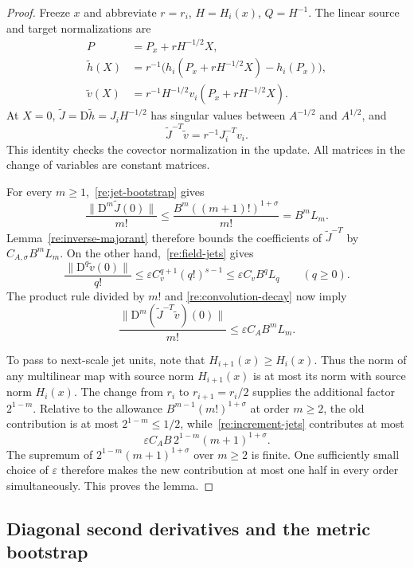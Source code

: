 \begin{proof}
Freeze $x$ and abbreviate $r=r_i$, $H=H_i(x)$, $Q=H^{-1}$.
The linear source and target normalizations are
\[
 \begin{aligned}
 P&=P_x+rH^{-1/2}X,\\
 \widetilde h(X)
   &=r^{-1}\bigl(h_i(P_x+rH^{-1/2}X)-h_i(P_x)\bigr),\\
 \widetilde v(X)&=r^{-1}H^{-1/2}v_i(P_x+rH^{-1/2}X).
 \end{aligned}
\]
At $X=0$, $\widetilde J=\mathrm D\widetilde h=J_iH^{-1/2}$
has singular values between $A^{-1/2}$ and $A^{1/2}$, and
\[
 \widetilde J^{-T}\widetilde v
           =r^{-1}J_i^{-T}v_i.
\]
This identity checks the covector normalization in the update.  All matrices in the change of variables
are constant matrices.

For every $m\ge1$,~\eqref{re:jet-bootstrap} gives
\[
 \frac{\|\mathrm D^m\widetilde J(0)\|}{m!}
 \le\frac{B^m((m+1)!)^{1+\sigma}}{m!}
 =B^m L_m.
\]
Lemma~\ref{re:inverse-majorant} therefore bounds the coefficients
of $\widetilde J^{-T}$ by $C_{A,\sigma}B^mL_m$.
On the other hand,~\eqref{re:field-jets} gives
\[
 \frac{\|\mathrm D^q\widetilde v(0)\|}{q!}
       \le\varepsilon C_v^{q+1}(q!)^{s-1}
       \le\varepsilon C_v B^qL_q\qquad(q\ge0).
\]
The product rule divided by $m!$ and
\eqref{re:convolution-decay} now imply
\begin{equation}
 \label{re:increment-jets}
 \frac{\|\mathrm D^m(\widetilde J^{-T}\widetilde v)(0)\|}{m!}
       \le\varepsilon C_A B^m L_m.
\end{equation}

To pass to next-scale jet units, note that
$H_{i+1}(x)\ge H_i(x)$.  Thus the norm of any multilinear map with
source norm $H_{i+1}(x)$ is at most its norm with source norm $H_i(x)$.
The change from $r_i$ to $r_{i+1}=r_i/2$ supplies the additional factor
$2^{1-m}$.  Relative to the allowance
$B^{m-1}(m!)^{1+\sigma}$ at order $m\ge2$, the old contribution is
at most $2^{1-m}\le1/2$, while~\eqref{re:increment-jets} contributes
at most
\[
 \varepsilon C_A B\,2^{1-m}(m+1)^{1+\sigma}.
\]
The supremum of $2^{1-m}(m+1)^{1+\sigma}$ over $m\ge2$ is finite.
One sufficiently small choice of $\varepsilon$ therefore makes the
new contribution at most one half in every order simultaneously.
This proves the lemma.
\end{proof}

\subsection{Diagonal second derivatives and the metric bootstrap}

